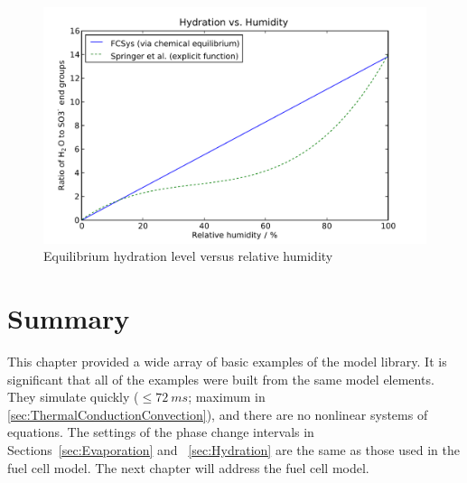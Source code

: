 \begin{figure}[htbp]
  \includegraphics[width=\linewidth]{Results/Basic/Hydration/2/Level}%
  \caption{Equilibrium hydration level versus relative humidity}%
  \label{fig:HydrationEquil}
\end{figure}



\section{Summary}

This chapter provided a wide array of basic examples of the model library.  It is significant that all of the examples were built from the same model elements.  They simulate quickly (${\leq \SI{72}{ms}}$; maximum in \autoref{sec:ThermalConductionConvection}), and there are no nonlinear systems of equations.  The settings of the phase change intervals in Sections~\ref{sec:Evaporation} and ~\ref{sec:Hydration} are the same as those used in the fuel cell model.  The next chapter will address the fuel cell model.
